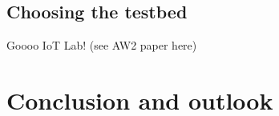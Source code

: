 \documentclass{acm_proc_article-sp}
\begin{document}
\subsection{Choosing the testbed}
\label{subsec:testbed_choice}
Goooo IoT Lab! (see AW2 paper here)

\section{Conclusion and outlook}
\label{sec:Conclusion}

\end{document}

